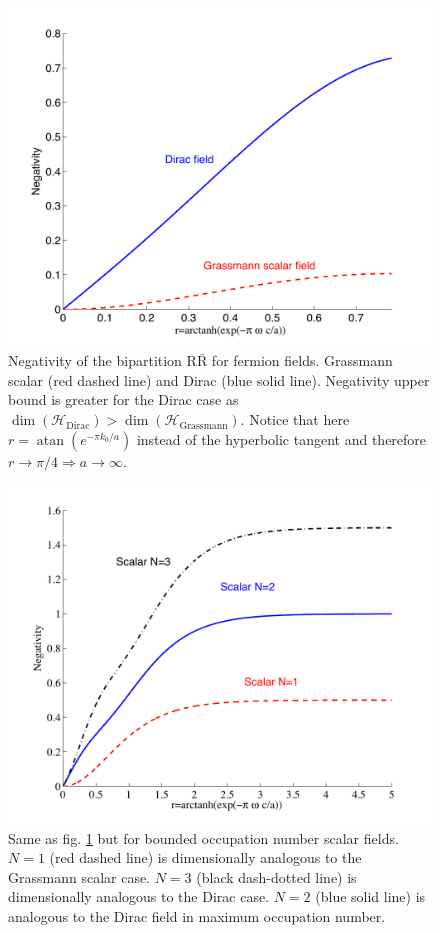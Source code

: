 \begin{figure}[h]
\begin{center}
\includegraphics[width=.85\textwidth]{comparison1}
\end{center}
\caption{ Negativity of the bipartition $\text{R}{\bar{\text{R}}}$ for fermion fields. Grassmann scalar (red dashed line) and Dirac (blue solid line). Negativity upper bound is greater for the Dirac case as $\dim(\mathcal{H}_{\text{Dirac}})>\dim(\mathcal{H}_{\text{Grassmann}})$. Notice that here $r=\operatorname{atan}(e^{-\pi k_0/a})$ instead of the hyperbolic tangent and therefore $r\rightarrow\pi/4\Rightarrow a\rightarrow\infty$. }
\label{comparison1}
\end{figure}
\begin{figure}[h]
\begin{center}
\includegraphics[width=.85\textwidth]{comparison2}
\end{center}
\caption{ Same as fig. \ref{comparison1} but for bounded occupation number scalar fields. $N=1$ (red dashed line) is dimensionally analogous to the Grassmann scalar case. $N=3$ (black dash-dotted line) is dimensionally analogous to the Dirac case. $N=2$ (blue solid line) is analogous to the Dirac field in maximum occupation number.}
\label{comparison2}
\end{figure}

